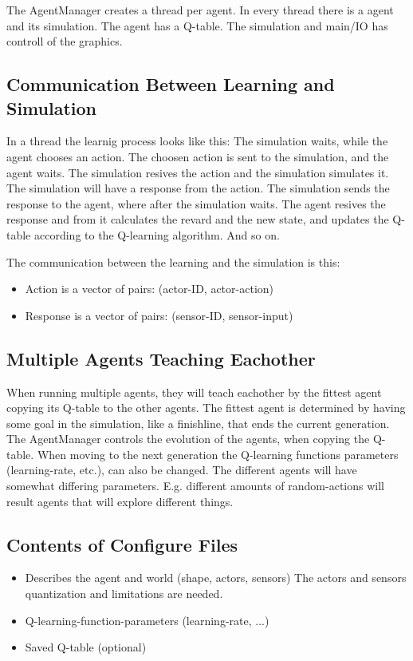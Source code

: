 \documentclass{article}
\begin{document}
The AgentManager creates a thread per agent. In every thread there is a
agent and its simulation. The agent has a Q-table. The simulation and main/IO
has controll of the graphics.


\subsection{Communication Between Learning and Simulation}
In a thread the learnig process looks like this: The simulation waits, while
the agent chooses an action. The choosen action is sent to the simulation, and
the agent waits. The simulation resives the action and the simulation
simulates it. The simulation will have a response from the action.
The simulation sends the response to the agent, where after the simulation
waits. The agent resives the response and from it calculates the revard and
the new state, and updates the Q-table according to the Q-learning
algorithm. And so on.

The communication between the learning and the simulation is this:
\begin{itemize}
  \item Action is a vector of pairs: (actor-ID, actor-action)
  \item Response is a vector of pairs: (sensor-ID, sensor-input)
\end{itemize}


\subsection{Multiple Agents Teaching Eachother}
When running multiple agents, they will teach eachother by the fittest
agent copying its Q-table to the other agents. The fittest agent is
determined by having some goal in the simulation, like a finishline, that
ends the current generation. The AgentManager controls the evolution
of the agents, when copying the Q-table. When moving to the next generation
the Q-learning functions parameters (learning-rate, etc.), can also be changed.
The different agents will have somewhat differing parameters. E.g. different
amounts of random-actions will result agents that will explore different things.


\subsection{Contents of Configure Files}
\begin{itemize}
  \item Describes the agent and world (shape, actors, sensors)
  The actors and sensors quantization and limitations are needed.
  \item Q-learning-function-parameters (learning-rate, ...)
  \item Saved Q-table (optional)
\end{itemize}
\end{document}
